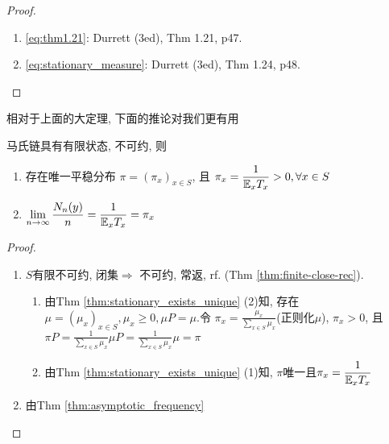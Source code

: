 \begin{proof}
\begin{enumerate}
\item \eqref{eq:thm1.21}: Durrett (3ed), Thm 1.21, p47.
\item \eqref{eq:stationary_measure}: Durrett (3ed), Thm 1.24, p48.
\end{enumerate}
\end{proof}

相对于上面的大定理, 下面的推论对我们更有用

\begin{corollary}
    马氏链具有有限状态, 不可约, 则
    \begin{enumerate}
        \item 存在唯一平稳分布 $\pi=(\pi_x)_{x\in S}$, 且 $\displaystyle\pi_x=\frac{1}{\mathbb E_xT_x}>0,\forall x\in S$
        \item $\displaystyle\lim_{n\to\infty}\frac{N_n(y)}{n}=\frac{1}{\mathbb E_xT_x}=\pi_x$
    \end{enumerate}
\end{corollary}

\begin{proof}
\begin{enumerate}
    \item $S$有限不可约, 闭集$\Rightarrow$ 不可约, 常返, rf. (Thm \ref{thm:finite-close-rec}).
    \begin{enumerate}
        \item 由Thm \ref{thm:stationary_exists_unique} (2)知, 存在$\mu=(\mu_x)_{x\in S},\mu_x\geq 0, \mu P=\mu$.令 $\displaystyle\pi_x=\frac{\mu_x}{\sum_{x\in S}\mu_x}$(正则化$\mu$), $\pi_x>0$, 且 $\displaystyle\pi P=\frac{1}{\sum_{x\in S}\mu_x}\mu P=\frac{1}{\sum_{x\in S}\mu_x}\mu=\pi$
        \item 由Thm \ref{thm:stationary_exists_unique} (1)知, $\pi$唯一且$\displaystyle\pi_x=\frac{1}{\mathbb E_xT_x}$
    \end{enumerate}
    \item 由Thm \ref{thm:asymptotic_frequency}
\end{enumerate}
\end{proof}
\newpage
